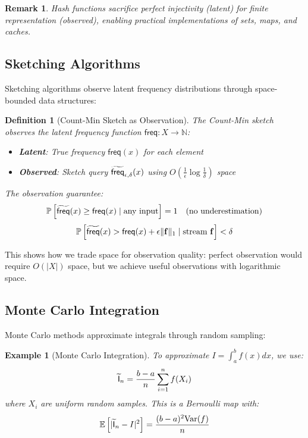 \documentclass[11pt,final,hidelinks]{article}
\newtheorem{definition}[theorem]{Definition}
\newtheorem{example}[theorem]{Example}
\newtheorem{remark}[theorem]{Remark}
\newcommand{\AFun}[1]{\obs{\mathsf{#1}}}  %
\begin{document}
\begin{remark}
Hash functions sacrifice perfect injectivity (latent) for finite representation (observed), enabling practical implementations of sets, maps, and caches.
\end{remark}

\subsection{Sketching Algorithms}

Sketching algorithms observe latent frequency distributions through space-bounded data structures:

\begin{definition}[Count-Min Sketch as Observation]
The Count-Min sketch \cite{cormode2005} observes the latent frequency function $\mathsf{freq} : X \to \mathbb{N}$:
\begin{itemize}
    \item \textbf{Latent}: True frequency $\mathsf{freq}(x)$ for each element
    \item \textbf{Observed}: Sketch query $\widetilde{\mathsf{freq}}_{\epsilon,\delta}(x)$ using $O(\frac{1}{\epsilon} \log \frac{1}{\delta})$ space
\end{itemize}
The observation guarantee:
\begin{equation}
\mathbb{P}\left[\widetilde{\mathsf{freq}}(x) \geq \mathsf{freq}(x) \mid \text{any input}\right] = 1 \quad \text{(no underestimation)}
\end{equation}
\begin{equation}
\mathbb{P}\left[\widetilde{\mathsf{freq}}(x) > \mathsf{freq}(x) + \epsilon \|\mathbf{f}\|_1 \mid \text{stream } \mathbf{f}\right] < \delta
\end{equation}
\end{definition}

This shows how we trade space for observation quality: perfect observation would require $O(|X|)$ space, but we achieve useful observations with logarithmic space.

\subsection{Monte Carlo Integration}

Monte Carlo methods approximate integrals through random sampling:

\begin{example}[Monte Carlo Integration]
To approximate $I = \int_a^b f(x) dx$, we use:
\begin{equation}
\AFun{I}_n = \frac{b-a}{n} \sum_{i=1}^n f(X_i)
\end{equation}
where $X_i$ are uniform random samples. This is a Bernoulli map with:
\begin{equation}
\Expect{|\AFun{I}_n - I|^2} = \frac{(b-a)^2 \text{Var}(f)}{n}
\end{equation}
\end{example}
\end{document}

